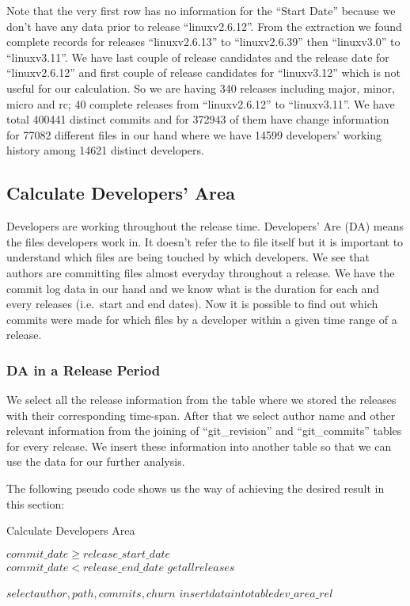 \documentclass{acm_proc_article-sp}
\begin{document}
Note that the very first row has no information for the ``Start Date'' because we don't have any data prior to release ``linuxv2.6.12''. From the extraction we found complete records for releases ``linuxv2.6.13'' to ``linuxv2.6.39'' then ``linuxv3.0'' to ``linuxv3.11''. We have last couple of release candidates and the release date for ``linuxv2.6.12'' and first couple of release candidates for ``linuxv3.12'' which is not useful for our calculation. So we are having 340 releases including major, minor, micro and rc; 40 complete releases from ``linuxv2.6.12'' to ``linuxv3.11''. We have total 400441 distinct commits and for 372943 of them have change information for 77082 different files in our hand where we have 14599 developers' working history among 14621 distinct developers.

\subsection{Calculate Developers' Area}
Developers are working throughout the release time. Developers' Are (DA) means the files developers work in. It doesn't refer the to file itself but it is important to understand which files are being touched by which developers. We see that authors are committing files almost everyday throughout a release. We have the commit log data in our hand and we know what is the duration for each and every releases (i.e.\ start and end dates). Now it is possible to find out which commits were made for which files by a developer within a given time range of a release.

\subsubsection{DA in a Release Period}
We select all the release information from the table where we stored the releases with their corresponding time-span. After that we select author name and other relevant information from the joining of ``git\_revision'' and ``git\_commits'' tables for every release. We insert these information into another table so that we can use the data for our further analysis.

The following pseudo code shows us the way of achieving the desired result in this section:

\begin{algorithm}
\caption{Calculate Developers Area}
\begin{algorithmic}
\REQUIRE $ $\\
$commit\_date \geq  release\_start\_date$\\
$commit\_date < release\_end\_date$
\ENSURE
\STATE $get all releases$

		\STATE $select author, path, commits, churn$
		\STATE $insert data into table dev\_area\_rel$
	\ENDIF
\ENDIF
\ENDWHILE
\end{algorithmic}
\end{algorithm}
\end{document}
